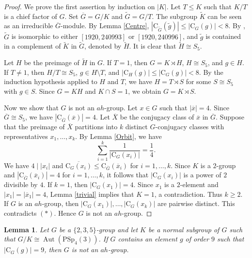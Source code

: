 \documentclass[11pt]{article}
\providecommand{\PSp}{{\mathrm{PSp}}}
\providecommand{\C}{{\mathrm{C}}}
\providecommand{\Aut}{{\operatorname{Aut}}}
\providecommand{\olx}{{\overline{x}}}
\providecommand{\olG}{{\overline{G}}}
\providecommand{\olX}{{\overline{X}}}
\providecommand{\wtg}{{\widetilde{g}}}
\providecommand{\wtG}{{\widetilde{G}}}
\providecommand{\wtH}{{\widetilde{H}}}
\providecommand{\wtK}{{\widetilde{K}}}
\newtheorem{lem}{Lemma}
\begin{document}
\begin{proof}
    We prove the first assertion by induction on $|K|$.
    Let $T\leq K$ such that $K/T$ is a chief factor of $G$.
    Set $\olG=G/K$ and $\wtG =G/T$.
    The subgroup $\wtK$ can be seen as an irreducible $\olG$-module.
    By Lemma \ref{Centre}, $|\C_{\wtG}(\wtg)|\leq |\C_G(g)|<8$.
    By \cite[Code 4]{Git}, $\wtG$ is isomorphic to either
    $[1920,240993]$ or $[1920,240996]$,
    and $\wtg$ is contained in a complement of $\wtK$ in $\wtG$,
    denoted by $\wtH$.
    It is clear that $\wtH\cong S_5$.
    
    Let $H$ be the preimage of $\wtH$ in $G$.
    If $T=1$, then $G=K\rtimes H$, $H\cong S_5$, and $g\in H$.
    If $T\neq 1$, then $H/T\cong S_5$, $g\in H\setminus T$, and
    $|\C_H(g)|\leq |\C_G(g)|<8$.
    By the induction hypothesis applied to $H$ and $T$, we have
    $H=T\rtimes S$ for some $S\cong S_5$ with $g\in S$.
    Since $G=KH$ and $K\cap S=1$, we obtain $G=K\rtimes S$.

    Now we show that $G$ is not an $ah$-group.
    Let $x\in G$ such that $|\olx|=4$.
    Since $\olG\cong S_5$, we have $|\C_{\olG}(\olx)|=4$.
    Let $\olX$ be the conjugacy class of $\olx$ in $\olG$.
    Suppose that the preimage of $\olX$ partitions into $k$ distinct
    $G$-conjugacy classes with representatives $x_1,\ldots,x_k$.
    By Lemma \ref{Orbit}, we have 
    \begin{equation}
        \sum_{i=1}^{k} \dfrac{1}{|\C_G(x_i)|} = \dfrac{1}{4}. \tag{$\ast$}
    \end{equation}
    We have $4\mid |x_i|$ and
    $\overline{\C_G(x_i)}\leq \C_{\olG}(\olx_i)$ for $i=1,\ldots,k$.
    Since $K$ is a $2$-group and $|\C_{\olG}(\olx_i)|=4$ for $i=1,\ldots,k$,
    it follows that $|\C_G(x_i)|$ is a power of $2$ divisible by $4$.
    If $k=1$, then $|\C_G(x_1)|=4$.
    Since $x_1$ is a $2$-element and $|x_1|=|\olx_1|=4$,
    Lemma \ref{trivial} implies that $K=1$, a contradiction.
    Thus $k\geq 2$.
    If $G$ is an $ah$-group, then $|\C_G(x_1)|,\ldots,|\C_G(x_k)|$ are pairwise distinct.
    This contradicts $(*)$.
    Hence $G$ is not an $ah$-group.
\end{proof}

  \begin{lem}
  \label{AutPSp43extension}
      Let $G$ be a $\{2,3,5\}$-group and let $K$ be a normal subgroup of
      $G$
      such that $G/K\cong \Aut(\PSp_4(3))$.
      If $G$ contains an element $g$ of order $9$ such that $|\C_G(g)|=9$,
      then $G$ is not an $ah$-group.
  \end{lem}
\end{document}
